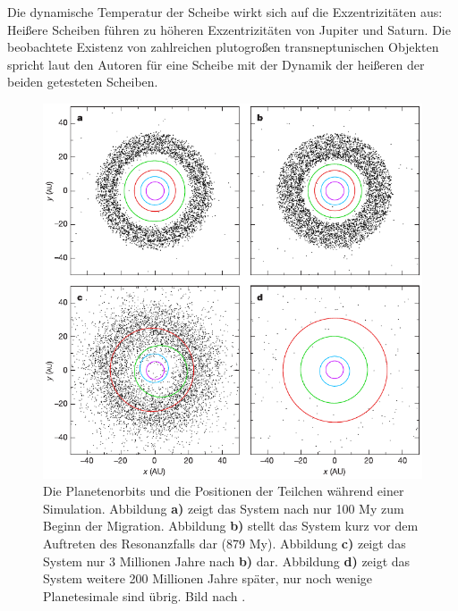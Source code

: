 \documentclass[12pt,a4paper,twoside]{article}
\renewcommand{\cite}{\citep}
\begin{document}
Die dynamische Temperatur der Scheibe wirkt sich auf die Exzentrizitäten aus: Heißere Scheiben führen zu höheren Exzentrizitäten von Jupiter und Saturn. Die beobachtete Existenz von zahlreichen plutogroßen transneptunischen Objekten spricht laut den Autoren für eine Scheibe mit der Dynamik der heißeren der beiden getesteten Scheiben\cite{Tsiganis2005}. %



\begin{figure}[tbn]
\centering
\includegraphics[scale=1]{img/Gomes2005-2.pdf}
\caption{Die Planetenorbits und die Positionen der Teilchen während einer Simulation. Abbildung \textbf{a)} zeigt das System nach nur 100 My zum Beginn der Migration. Abbildung \textbf{b)} stellt das System kurz vor dem Auftreten des Resonanzfalls dar (879 My). Abbildung \textbf{c)} zeigt das System nur 3 Millionen Jahre nach \textbf{b)} dar. Abbildung \textbf{d)} zeigt das System weitere 200 Millionen Jahre später, nur noch wenige Planetesimale sind übrig. Bild nach \cite{Gomes2005}.} %
\label{fig:Zeitlicheentwicklung}
\end{figure}
\end{document}
